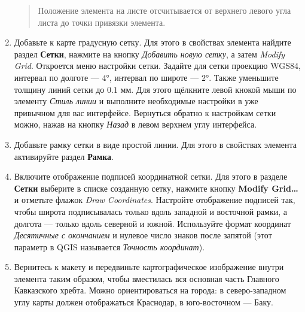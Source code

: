 \documentclass[
  12pt,
]{book}
\begin{document}
\begin{enumerate}
  \begin{quote}
  Положение элемента на листе отсчитывается от верхнего левого угла листа до точки привязки элемента.
  \end{quote}
\item
  Добавьте к карте градусную сетку. Для этого в свойствах элемента найдите раздел \textbf{Сетки}, нажмите на кнопку \emph{Добавить новую сетку}, а затем \emph{Modify Grid}. Откроется меню настройки сетки. Задайте для сетки проекцию WGS84, интервал по долготе --- \(4°\), интервал по широте --- \(2°\). Также уменьшите толщину линий сетки до \(0.1\) мм. Для этого щёлкните левой кнокой мыши по элементу \emph{Стиль линии} и выполните необходимые настройки в уже привычном для вас интерфейсе. Вернуться обратно к настройкам сетки можно, нажав на кнопку \emph{Назад} в левом верхнем углу интерфейса.
\item
  Добавьте рамку сетки в виде простой линии. Для этого в свойствах элемента активируйте раздел \textbf{Рамка}.
\item
  Включите отображение подписей координатной сетки. Для этого в разделе \textbf{Сетки} выберите в списке созданную сетку, нажмите кнопку \textbf{Modify Grid\ldots{}} и отметьте флажок \emph{Draw Coordinates}. Настройте отображение подписей так, чтобы широта подписывалась только вдоль западной и восточной рамки, а долгота --- только вдоль северной и южной. Используйте формат координат \emph{Десятичные с окончанием} и нулевое число знаков после запятой (этот параметр в QGIS называется \emph{Точность координат}).
\item
  Вернитесь к макету и передвиньте картографическое изображение внутри элемента таким образом, чтобы вместилась вся основная часть Главного Кавказского хребта. Можно ориентироваться на города: в северо-западном углу карты должен отображаться Краснодар, в юго-восточном --- Баку.


\end{enumerate}
\end{document}
